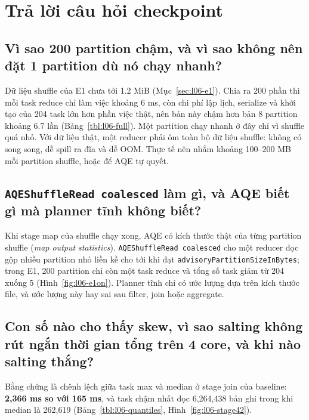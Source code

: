 \documentclass[
  12pt,
  a4paper,
]{article}
\begin{document}
\section{Trả lời câu hỏi checkpoint}\label{sec:l06-discussion}

\subsection{Vì sao 200 partition chậm, và vì sao không nên đặt 1
partition dù nó chạy nhanh?}\label{sec:l06-q1}

Dữ liệu shuffle của E1 chưa tới 1.2 MiB (Mục~\ref{sec:l06-e1}). Chia ra
200 phần thì mỗi task reduce chỉ làm việc khoảng 6 ms, còn chi phí lập
lịch, serialize và khởi tạo của 204 task lớn hơn phần việc thật, nên bản
này chậm hơn bản 8 partition khoảng 6.7 lần (Bảng~\ref{tbl:l06-full}).
Một partition chạy nhanh ở đây chỉ vì shuffle quá nhỏ. Với dữ liệu thật,
một reducer phải ôm toàn bộ dữ liệu shuffle: không có song song, dễ
spill ra đĩa và dễ OOM. Thực tế nên nhắm khoảng 100--200 MB mỗi
partition shuffle, hoặc để AQE tự quyết.

\subsection{\texorpdfstring{\texttt{AQEShuffleRead\ coalesced}\allowbreak{}
làm gì, và AQE biết gì mà planner tĩnh không
biết?}{AQEShuffleRead coalesced làm gì, và AQE biết gì mà planner tĩnh không biết?}}\label{sec:l06-q2}

Khi stage map của shuffle chạy xong, AQE có kích thước thật của từng
partition shuffle (\emph{map output statistics}).
\texttt{AQEShuffleRead\ coalesced}\allowbreak{} cho một reducer đọc gộp
nhiều partition nhỏ liền kề cho tới khi đạt
\texttt{advisoryPartitionSizeInBytes}\allowbreak{}; trong E1, 200
partition chỉ còn một task reduce và tổng số task giảm từ 204 xuống 5
(Hình~\ref{fig:l06-e1on}). Planner tĩnh chỉ có ước lượng dựa trên kích
thước file, và ước lượng này hay sai sau filter, join hoặc aggregate.

\subsection{Con số nào cho thấy skew, vì sao salting không rút ngắn thời
gian tổng trên 4 core, và khi nào salting thắng?}\label{sec:l06-q3}

Bằng chứng là chênh lệch giữa task max và median ở stage join của
baseline: \textbf{2,366 ms so với 165 ms}, và task chậm nhất đọc
6,264,438 bản ghi trong khi median là 262,619
(Bảng~\ref{tbl:l06-quantiles}, Hình~\ref{fig:l06-stage42}).
\end{document}
